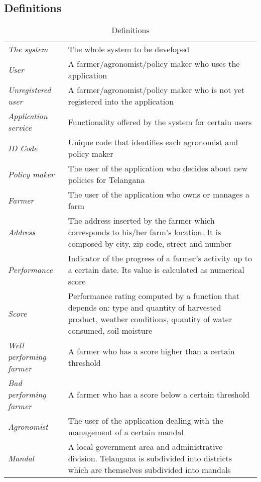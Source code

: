 \newpage
\subsection{Definitions}
\begin{center}
\setlength\tabcolsep{7pt}
\renewcommand{\arraystretch}{2}
\begin{longtable}{|m{3.2cm}|m{8.3cm}|}
\caption{Definitions}\\
\hline
\endfirsthead
\endhead
\hline
\endlastfoot
\textit{The system} & The whole system to be developed \\
\textit{User} & A farmer/agronomist/policy maker who uses the application\\
\textit{Unregistered user} & A farmer/agronomist/policy maker who is not yet registered into the application\\
\textit{Application service} & Functionality offered by the system for certain users \\
\textit{ID Code} & Unique code that identifies each agronomist and policy maker\\
\textit{Policy maker} & The user of the application who decides about new policies for Telangana \\
\textit{Farmer} & The user of the application who owns or manages a farm\\
\textit{Address} & The address inserted by the farmer which corresponds to his/her farm's location. It is composed by city, zip code, street and number\\
\textit{Performance} & Indicator of the progress of a farmer's activity up to a certain date. Its value is calculated as numerical score \\
\textit{Score} & Performance rating computed by a function that depends on: type and quantity of harvested product, weather conditions, quantity of water consumed, soil moisture\\
\textit{Well performing farmer} & A farmer who has a score higher than a certain threshold\\
\textit{Bad performing farmer} & A farmer who has a score below a certain threshold\\
\textit{Agronomist} & The user of the application dealing with the management of a certain mandal\\
\textit{Mandal} & A local government area and  administrative division. Telangana is subdivided into districts which are themselves subdivided into mandals\\

\end{longtable}
\end{center}
